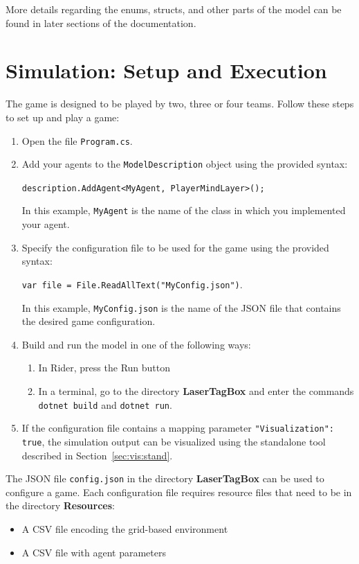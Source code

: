 \documentclass[a4paper,english,DIV=16,11pt,parskip=half,dvipsnames,listof=totoc,index=totoc,bibliography=totoc]{scrartcl}
\begin{document}
More details regarding the enums, structs, and other parts of the model can be found in later sections of the documentation.
%
\section{Simulation: Setup and Execution} \label{sec:simSetup}
%
The game is designed to be played by two, three or four teams. Follow these steps to set up and play a game:
\begin{enumerate}
  \item Open the file \texttt{Program.cs}.
  \item Add your agents to the \texttt{ModelDescription} object using the provided syntax:%
  \begin{center}
    \texttt{description.AddAgent<MyAgent, PlayerMindLayer>();}
  \end{center}%
  In this example, \texttt{MyAgent} is the name of the class in which you implemented your agent.
  \item Specify the configuration file to be used for the game using the provided syntax:%
  \begin{center}
    \texttt{var file = File.ReadAllText("MyConfig.json")}.
  \end{center}%
  In this example, \texttt{MyConfig.json} is the name of the JSON file that contains the desired game configuration.
  \item Build and run the model in one of the following ways:%
  \begin{enumerate}
    \item In Rider, press the \textcolor{OliveGreen}{\Forward} Run button
    \item In a terminal, go to the directory \textbf{LaserTagBox} and enter the commands \texttt{dotnet build} and \texttt{dotnet run}.
  \end{enumerate}%
  \item If the configuration file contains a mapping parameter \texttt{"Visualization": true}, the simulation output can be visualized using the standalone tool described in Section~\ref{sec:vis:stand}.
\end{enumerate}
%
The JSON file \texttt{config.json} in the directory \textbf{LaserTagBox} can be used to configure a game. Each configuration file requires resource files that need to be in the directory \textbf{Resources}:%
%
\begin{itemize}
  \item A CSV file encoding the grid-based environment
  \item A CSV file with agent parameters
\end{itemize}
\end{document}
